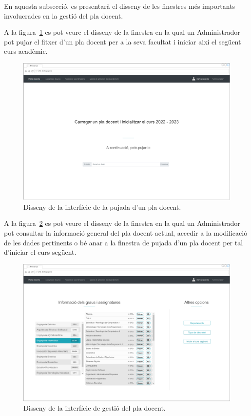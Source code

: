 \documentclass[a4paper,12pt]{ThesisStyle}
\begin{document}
En aquesta subsecció, es presentarà el disseny de les finestres més importants involucrades en la gestió del pla docent.

A la figura~\ref{img:plaDocent_pujada} es pot veure el disseny de la finestra en la qual un Administrador pot pujar el fitxer d'un pla docent per a la seva facultat i iniciar així el següent curs acadèmic. 

\begin{figure}[H]
	\centering
	\includegraphics[width=\textwidth]{assets/interfaces/plaDocent/pujada.pdf}
	\caption{\label{img:plaDocent_pujada}Disseny de la interfície de la pujada d'un pla docent.}
\end{figure}

A la figura~\ref{img:plaDocent_general} es pot veure el disseny de la finestra en la qual un Administrador pot consultar la informació general del pla docent actual, accedir a la modificació de les dades pertinents o bé anar a la finestra de pujada d'un pla docent per tal d'iniciar el curs següent.

\begin{figure}[H]
	\centering
	\includegraphics[width=\textwidth]{assets/interfaces/plaDocent/general.pdf}
	\caption{\label{img:plaDocent_general}Disseny de la interfície de gestió del pla docent.}
\end{figure}
\end{document}
